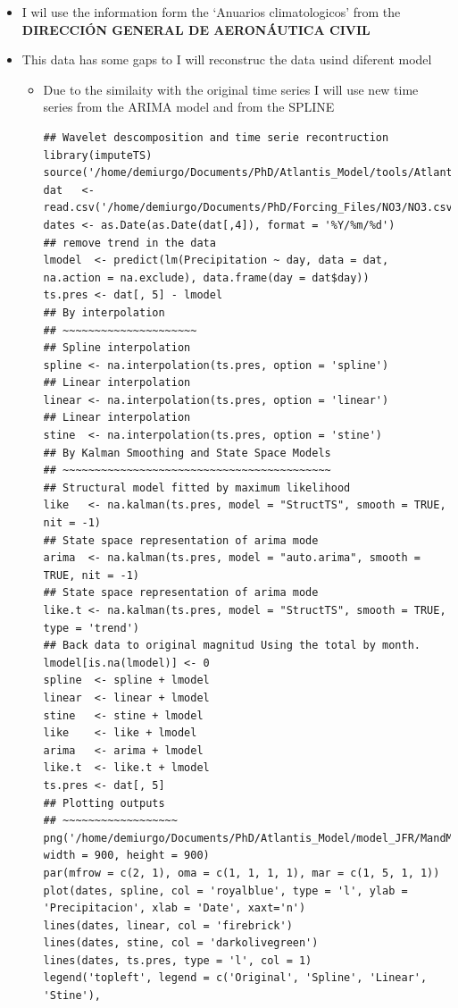 \documentclass[11pt]{article}
\begin{document}
\begin{itemize}
\item I wil use the information form the `Anuarios climatologicos' from the \textbf{DIRECCIÓN GENERAL DE AERONÁUTICA CIVIL}
\item This data has some gaps to I will reconstruc the data usind diferent model
\begin{itemize}
\item Due to the similaity with the original time series I will use new time series from the ARIMA model and from the SPLINE

\begin{verbatim}
## Wavelet descomposition and time serie recontruction
library(imputeTS)
source('/home/demiurgo/Documents/PhD/Atlantis_Model/tools/Atlantis_tools.R')
dat   <- read.csv('/home/demiurgo/Documents/PhD/Forcing_Files/NO3/NO3.csv')
dates <- as.Date(as.Date(dat[,4]), format = '%Y/%m/%d')
## remove trend in the data
lmodel  <- predict(lm(Precipitation ~ day, data = dat, na.action = na.exclude), data.frame(day = dat$day))
ts.pres <- dat[, 5] - lmodel
## By interpolation
## ~~~~~~~~~~~~~~~~~~~~~
## Spline interpolation
spline <- na.interpolation(ts.pres, option = 'spline')
## Linear interpolation
linear <- na.interpolation(ts.pres, option = 'linear')
## Linear interpolation
stine  <- na.interpolation(ts.pres, option = 'stine')
## By Kalman Smoothing and State Space Models
## ~~~~~~~~~~~~~~~~~~~~~~~~~~~~~~~~~~~~~~~~~~
## Structural model fitted by maximum likelihood
like   <- na.kalman(ts.pres, model = "StructTS", smooth = TRUE, nit = -1)
## State space representation of arima mode
arima  <- na.kalman(ts.pres, model = "auto.arima", smooth = TRUE, nit = -1)
## State space representation of arima mode
like.t <- na.kalman(ts.pres, model = "StructTS", smooth = TRUE, type = 'trend')
## Back data to original magnitud Using the total by month.
lmodel[is.na(lmodel)] <- 0
spline  <- spline + lmodel
linear  <- linear + lmodel
stine   <- stine + lmodel
like    <- like + lmodel
arima   <- arima + lmodel
like.t  <- like.t + lmodel
ts.pres <- dat[, 5]
## Plotting outputs
## ~~~~~~~~~~~~~~~~~~
png('/home/demiurgo/Documents/PhD/Atlantis_Model/model_JFR/MandM/img/Rain.png', width = 900, height = 900)
par(mfrow = c(2, 1), oma = c(1, 1, 1, 1), mar = c(1, 5, 1, 1))
plot(dates, spline, col = 'royalblue', type = 'l', ylab = 'Precipitacion', xlab = 'Date', xaxt='n')
lines(dates, linear, col = 'firebrick')
lines(dates, stine, col = 'darkolivegreen')
lines(dates, ts.pres, type = 'l', col = 1)
legend('topleft', legend = c('Original', 'Spline', 'Linear', 'Stine'),

\end{verbatim}
\end{itemize}
\end{itemize}
\end{document}
